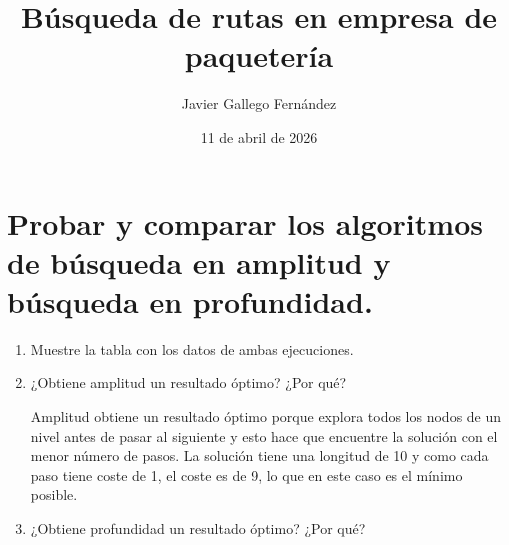 \documentclass[12pt,a4paper,spanish]{book}
\title{\textbf{Búsqueda de rutas en empresa de paquetería}}
\author{Javier Gallego Fernández}
\date{11 de abril de 2026}
\numberwithin{equation}{chapter}
\numberwithin{figure}{chapter}
\begin{document}
\renewcommand{\figurename}{Figura}
\renewcommand{\tablename}{Tabla} 

\maketitle
\setcounter{page}{1}
\thispagestyle{fancy}

\section{Probar y comparar los algoritmos de búsqueda en amplitud y búsqueda en profundidad.}

\begin{enumerate}
	\item Muestre la tabla con los datos de ambas ejecuciones.

	\begin{center}
	\small
	\setlength{\tabcolsep}{4pt}
	\end{center}

	\item ¿Obtiene amplitud un resultado óptimo? ¿Por qué?
	
	Amplitud obtiene un resultado óptimo porque explora todos los nodos de un nivel antes de pasar al siguiente y esto hace que encuentre la solución con el menor número de pasos. La solución tiene una longitud de 10 y como cada paso tiene coste de 1, el coste es de 9, lo que en este caso es el mínimo posible.
        
	\item ¿Obtiene profundidad un resultado óptimo? ¿Por qué?
	

\end{enumerate}
\end{document}
